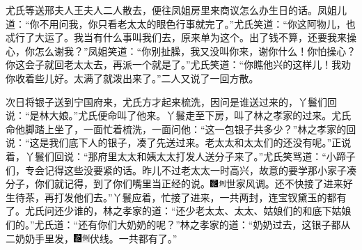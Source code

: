 尤氏等送邢夫人王夫人二人散去，便往凤姐房里来商议怎么办生日的话。凤姐儿道：``你不用问我，你只看老太太的眼色行事就完了。''尤氏笑道：``你这阿物儿，也忒行了大运了。我当有什么事叫我们去，原来单为这个。出了钱不算，还要我来操心，你怎么谢我？''凤姐笑道：``你别扯臊，我又没叫你来，谢你什么！你怕操心？你这会子就回老太太去，再派一个就是了。''尤氏笑道：``你瞧他兴的这样儿！我劝你收着些儿好。太满了就泼出来了。''二人又说了一回方散。

次日将银子送到宁国府来，尤氏方才起来梳洗，因问是谁送过来的，丫鬟们回说：``是林大娘。''尤氏便命叫了他来。丫鬟走至下房，叫了林之孝家的过来。尤氏命他脚踏上坐了，一面忙着梳洗，一面问他：``这一包银子共多少？''林之孝家的回说：``这是我们底下人的银子，凑了先送过来。老太太和太太们的还没有呢。''正说着，丫鬟们回说：``那府里太太和姨太太打发人送分子来了。''尤氏笑骂道：``小蹄子们，专会记得这些没要紧的话。昨儿不过老太太一时高兴，故意的要学那小家子凑分子，你们就记得，到了你们嘴里当正经的说。{\includegraphics[width=3mm]{../Images/00006}\includegraphics[width=3mm]{../Images/00011}\footnotesize \kaishu 世家风调。}还不快接了进来好生待茶，再打发他们去。''丫鬟应着，忙接了进来，一共两封，连宝钗黛玉的都有了。尤氏问还少谁的，林之孝家的道：``还少老太太、太太、姑娘们的和底下姑娘们的。''尤氏道：``还有你们大奶奶的呢？''林之孝家的道：``奶奶过去，这银子都从二奶奶手里发，{\includegraphics[width=3mm]{../Images/00006}\includegraphics[width=3mm]{../Images/00011}\footnotesize \kaishu 伏线。}一共都有了。''

